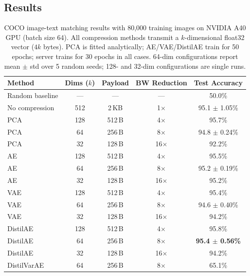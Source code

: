 \subsection{Results}

\begin{table}[h]
\centering
\caption{COCO image-text matching results with 80{,}000 training images on NVIDIA A40 GPU (batch size 64). All compression methods transmit a $k$-dimensional float32 vector ($4k$ bytes). PCA is fitted analytically; AE/VAE/DistilAE train for 50 epochs; server trains for 30 epochs in all cases. 64-dim configurations report mean $\pm$ std over 5 random seeds; 128- and 32-dim configurations are single runs.}
\label{tab:results}
\begin{tabular}{lcccc}
\toprule
\textbf{Method} & \textbf{Dims ($k$)} & \textbf{Payload} & \textbf{BW Reduction} & \textbf{Test Accuracy} \\
\midrule
Random baseline  & —   & —      & —          & 50.0\% \\
No compression   & 512 & 2\,KB  & 1$\times$  & 95.1 $\pm$ 1.05\% \\
\midrule
PCA              & 128 & 512\,B & 4$\times$  & 95.7\% \\
PCA              & 64  & 256\,B & 8$\times$  & 94.8 $\pm$ 0.24\% \\
PCA              & 32  & 128\,B & 16$\times$ & 92.2\% \\
\midrule
AE               & 128 & 512\,B & 4$\times$  & 95.5\% \\
AE               & 64  & 256\,B & 8$\times$  & 95.2 $\pm$ 0.19\% \\
AE               & 32  & 128\,B & 16$\times$ & 95.2\% \\
\midrule
VAE              & 128 & 512\,B & 4$\times$  & 95.4\% \\
VAE              & 64  & 256\,B & 8$\times$  & 94.6 $\pm$ 0.40\% \\
VAE              & 32  & 128\,B & 16$\times$ & 94.2\% \\
\midrule
DistilAE         & 128 & 512\,B & 4$\times$  & 95.8\% \\
DistilAE         & 64  & 256\,B & 8$\times$  & \textbf{95.4 $\pm$ 0.56\%} \\
DistilAE         & 32  & 128\,B & 16$\times$ & 94.2\% \\
DistilVarAE      & 64  & 256\,B & 8$\times$  & 65.1\% \\
\bottomrule
\end{tabular}
\end{table}

